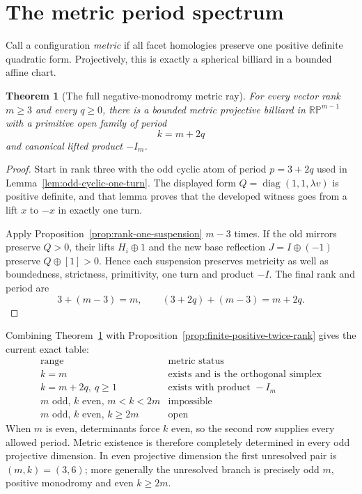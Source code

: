 \documentclass[11pt,a4paper]{article}
\theoremstyle{plain}
\newtheorem{theorem}{Theorem}[section]
\theoremstyle{definition}
\theoremstyle{remark}
\begin{document}
\section{The metric period spectrum}

Call a configuration \emph{metric} if all facet homologies preserve one positive
definite quadratic form. Projectively, this is exactly a spherical billiard in a
bounded affine chart.

\begin{theorem}[The full negative-monodromy metric ray]\label{thm:metric-ray}
For every vector rank $m\ge3$ and every $q\ge0$, there is a bounded metric
projective billiard in $\mathbb{RP}^{m-1}$ with a primitive open family of period
\[
                              k=m+2q
\]
and canonical lifted product $-I_m$.
\end{theorem}

\begin{proof}
Start in rank three with the odd cyclic atom of period $p=3+2q$ used in
Lemma~\ref{lem:odd-cyclic-one-turn}. The displayed form
$Q=\operatorname{diag}(1,1,\lambda v)$ is positive definite, and that lemma proves
that the developed witness goes from a lift $x$ to $-x$ in exactly one turn.

Apply Proposition~\ref{prop:rank-one-suspension} $m-3$ times. If the old mirrors
preserve $Q>0$, their lifts $H_i\oplus1$ and the new base reflection
$J=I\oplus(-1)$ preserve $Q\oplus[1]>0$. Hence each suspension preserves
metricity as well as boundedness, strictness, primitivity, one turn and product
$-I$. The final rank and period are
\[
                         3+(m-3)=m,
       \qquad (3+2q)+(m-3)=m+2q .
\]
\end{proof}

Combining Theorem~\ref{thm:metric-ray} with
Proposition~\ref{prop:finite-positive-twice-rank} gives the current exact table:
\[
\begin{array}{c|l}
\text{range} & \text{metric status}\\ \hline
k=m & \text{exists and is the orthogonal simplex}\\
k=m+2q,\ q\ge1 & \text{exists with product }-I_m\\
\text{$m$ odd, $k$ even, }m<k<2m & \text{impossible}\\
\text{$m$ odd, $k$ even, }k\ge2m & \text{open}
\end{array}
\]
When $m$ is even, determinants force $k$ even, so the second row supplies every
allowed period. Metric existence is therefore completely determined in every odd
projective dimension. In even projective dimension the first unresolved pair is
$(m,k)=(3,6)$; more generally the unresolved branch is precisely odd $m$,
positive monodromy and even $k\ge2m$.
\end{document}
